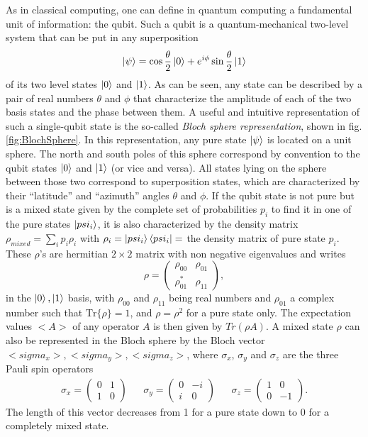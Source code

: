 As in classical computing, one can define in quantum computing a fundamental unit of information: the qubit. Such a qubit is a quantum-mechanical two-level system that can be put in any superposition
%
\begin{equation}
\left| \psi \right> = \cos{\frac{\theta}{2}}\left| 0 \right>+e^{i\phi}\sin{\frac{\theta}{2}}\left| 1 \right>
\end{equation}
%
of its two level states $\left| 0 \right>$ and $\left| 1 \right>$.
As can be seen, any state can be described by a pair of real numbers $\theta$ and $\phi$ that characterize the amplitude of each of the two basis states and the phase between them. A useful and intuitive representation of such a single-qubit state is the so-called {\it Bloch sphere representation}, shown in fig. \ref{fig:BlochSphere}. In this representation, any pure state $\left| \psi \right>$ is located on a unit sphere. The north and south poles of this sphere correspond by convention to the qubit states $\left| 0 \right>$ and $\left| 1 \right>$ (or vice and versa). All states lying on the sphere between those two correspond to superposition states, which are characterized by their ``latitude'' and ``azimuth'' angles $\theta$ and $\phi$. 
\smallskip
If the qubit state is not pure but is a mixed state given by the complete set of probabilities ${p_{i}}$ to find it in one of the pure states  ${\left| psi_{i} \right>}$, it is also characterized by the density matrix $\rho_{mixed} = \sum\limits_i p_i \rho_i$ with $\rho_i=\left| psi_{i} \right>\left< psi_{i} \right|=$ the density matrix of pure state ${p_{i}}$. These $\rho$'s are hermitian $2\times 2$ matrix with non negative eigenvalues and writes
%
\begin{equation}
\rho = \left( \begin{array}{cc} \rho_{00} & \rho_{01} \\ \rho_{01}^* & \rho_{11} \end{array} \right),
\end{equation}
%
in the ${\left| 0 \right>,\left| 1 \right>}$ basis, with $\rho_{00}$ and $\rho_{11}$ being real numbers and $\rho_{01}$ a complex number such that $\mathrm{Tr}\{\rho\}=1$, and $\rho=\rho^2$ for a pure state only. The expectation values $<A>$ of any operator $A$ is then given by $Tr(\rho A)$. A mixed state $\rho$ can also be represented in the Bloch sphere by the Bloch vector ${<sigma_x>,<sigma_y>,<sigma_z>}$, where $\sigma_x$, $\sigma_y$ and $\sigma_z$ are the three Pauli spin operators
%
\begin{align}
  \sigma_x  =  \left( \begin{array}{cc} 0 & 1 \\ 1 & 0 \end{array} \right)
  & & \sigma_y  =  \left( \begin{array}{cc} 0 & -i \\ i  &  0\end{array} \right)
  & & \sigma_z  =  \left( \begin{array}{cc} 1 & 0 \\ 0 & -1 \end{array} \right).
\label{eq:pauli_operators}
\end{align}
% 
The length of this vector decreases from 1 for a pure state down to 0 for a completely mixed state.


